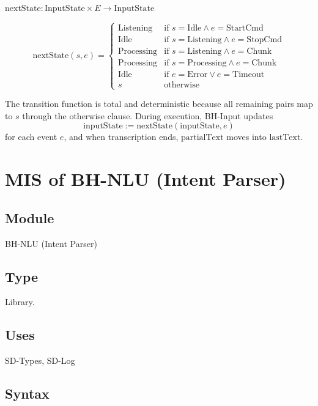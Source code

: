 \documentclass[12pt, titlepage]{article}
\begin{document}
\noindent
$\text{nextState} : \text{InputState} \times E \rightarrow \text{InputState}$

\[
  \text{nextState}(s, e) =
  \begin{cases}
    \text{Listening} & \text{if } s = \text{Idle} \land e = \text{StartCmd}\\
    \text{Idle} & \text{if } s = \text{Listening} \land e = \text{StopCmd}\\
    \text{Processing} & \text{if } s = \text{Listening} \land e = \text{Chunk}\\
    \text{Processing} & \text{if } s = \text{Processing} \land e = \text{Chunk}\\
    \text{Idle} & \text{if } e = \text{Error} \lor e = \text{Timeout}\\
    s & \text{otherwise}
  \end{cases}
\]

The transition function is total and deterministic because all remaining pairs
map to $s$ through the otherwise clause. During execution, BH-Input updates
\[
  \text{inputState} := \text{nextState}(\text{inputState}, e)
\]
for each event $e$, and when transcription ends, $\text{partialText}$ moves
into $\text{lastText}$.

\section{MIS of BH-NLU (Intent Parser)} \label{mod:BHNlu}

\subsection{Module}

BH-NLU (Intent Parser)

\subsection{Type}

Library.

\subsection{Uses}

SD-Types, SD-Log

\subsection{Syntax}
\end{document}
